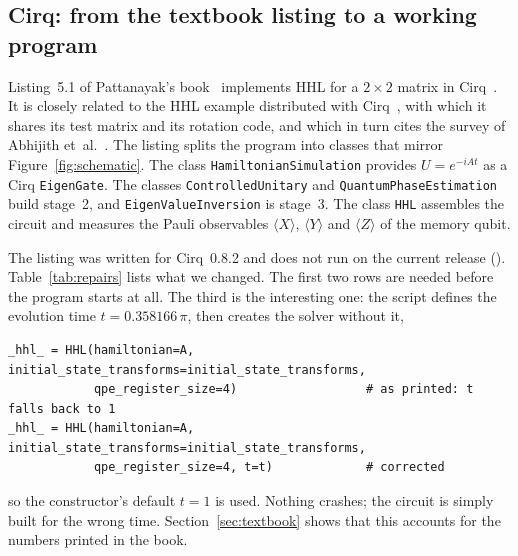 \documentclass[manuscript,screen,review,nonacm]{acmart}
\newcommand{\code}[1]{\texttt{#1}}
\begin{document}
\subsection{Cirq: from the textbook listing to a working program}
\label{sec:cirq}

\begin{sloppypar}
Listing~5.1 of Pattanayak's book~\cite{pattanayak2021} implements HHL for a
$2\times 2$ matrix in Cirq~\cite{cirq}. It is closely related to the HHL
example distributed with Cirq~\cite{cirqhhl}, with which it shares its test
matrix and its rotation code, and which in turn cites the survey of Abhijith
et~al.~\cite{abhijith2022}. The listing splits the program into classes that
mirror Figure~\ref{fig:schematic}. The class \code{HamiltonianSimulation}
provides $U=e^{-iAt}$ as a Cirq \code{EigenGate}. The classes
\code{ControlledUnitary} and \code{QuantumPhaseEstimation} build stage~2, and
\code{EigenValueInversion} is stage~3. The class \code{HHL} assembles the
circuit and measures the Pauli observables $\langle X\rangle$,
$\langle Y\rangle$ and $\langle Z\rangle$ of the memory qubit.
\end{sloppypar}

The listing was written for Cirq~0.8.2 and does not run on the current
release (\VerCirq). Table~\ref{tab:repairs} lists what we changed. The first
two rows are needed before the program starts at all. The third is the
interesting one: the script defines the evolution time
$t=0.358166\,\pi$, then creates the solver without it,
\begin{lstlisting}[frame=none,aboveskip=4pt,belowskip=4pt]
_hhl_ = HHL(hamiltonian=A, initial_state_transforms=initial_state_transforms,
            qpe_register_size=4)                  # as printed: t falls back to 1
_hhl_ = HHL(hamiltonian=A, initial_state_transforms=initial_state_transforms,
            qpe_register_size=4, t=t)             # corrected
\end{lstlisting}
so the constructor's default $t=1$ is used. Nothing crashes; the circuit is
simply built for the wrong time. Section~\ref{sec:textbook} shows that this
accounts for the numbers printed in the book.
\end{document}
